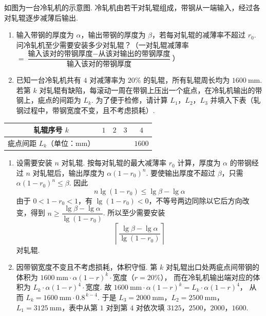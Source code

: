 \begin{problem}
如图为一台冷轧机的示意图. 冷轧机由若干对轧辊组成，带钢从一端输入，经过各对轧辊逐步减薄后输出.

\begin{enumerate}
\item 输入带钢的厚度为 \(\alpha\)，输出带钢的厚度为 \(\beta\)，若每对轧辊的减薄率不超过 \(r_0\). 问冷轧机至少需要安装多少对轧辊？（一对轧辊减薄率 \(=\dfrac{\text{输入该对的带钢厚度}-\text{从该对输出的带钢厚度}}{\text{输入该对的带钢厚度}}\)）
\item 已知一台冷轧机共有 \(4\) 对减薄率为 \(20\%\) 的轧辊，所有轧辊周长均为 \(1600\mathrm{~mm}\). 若第 \(k\) 对轧辊有缺陷，每滚动一周在带钢上压出一个疵点，在冷轧机输出的带钢上，疵点的间距为 \(L_k\). 为了便于检修，请计算 \(L_1\)，\(L_2\)，\(L_3\) 并填入下表（轧钢过程中，带钢宽度不变，且不考虑损耗）.
\end{enumerate}

\begin{center}
\begin{tabular}{|c|c|c|c|c|}
\hline
轧辊序号 \(k\) & \(1\) & \(2\) & \(3\) & \(4\) \\
\hline
疵点间距 \(L_k\)（单位：\(\mathrm{mm}\)） &\fillinblank{} &\fillinblank{} &\fillinblank{} & \(1600\) \\
\hline
\end{tabular}
\end{center}

\end{problem}

\begin{solution}
\begin{enumerate}
\item 设需要安装 \(n\) 对轧辊. 按每对轧辊的最大减薄率 \(r_0\) 计算，厚度为 \(\alpha\) 的带钢经过 \(n\) 对轧辊后，输出厚度为 \(\alpha(1-r_0)^n\). 要使输出厚度不超过 \(\beta\)，只需 \(\alpha(1-r_0)^n\le \beta\).
因此
\[
n\lg(1-r_0)\le\lg\beta-\lg\alpha
\]
由于 \(0<1-r_0<1\)，有 \(\lg(1-r_0)<0\)，不等号两边同除以它后方向改变，得到
\(n\ge \dfrac{\lg\beta-\lg\alpha}{\lg(1-r_0)}\). 所以至少需要安装
\[
\left\lceil\frac{\lg\beta-\lg\alpha}{\lg(1-r_0)}\right\rceil
\]
对轧辊.

\item 因带钢宽度不变且不考虑损耗，体积守恒. 第 \(k\) 对轧辊出口处两疵点间带钢的体积为 \(1600\mathrm{~mm}\cdot \alpha(1-r)^k\cdot \text{宽度}\)（\(r=20\%\)），
而在冷轧机输出端对应的体积为 \(L_k\cdot \alpha(1-r)^4\cdot \text{宽度}\).
故 \(1600\mathrm{~mm}\cdot \alpha(1-r)^k=L_k\cdot \alpha(1-r)^4\)，
从而 \(L_k=1600\mathrm{~mm}\cdot 0.8^{\,k-4}\).
于是 \(L_3=2000\mathrm{~mm}\)，\(L_2=2500\mathrm{~mm}\)，\(L_1=3125\mathrm{~mm}\)，表中从第 \(1\) 对到第 \(4\) 对依次填 \(3125\)，\(2500\)，\(2000\)，\(1600\).
\end{enumerate}
\end{solution}

